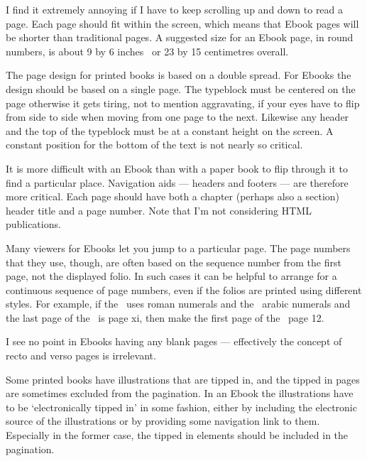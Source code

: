 \documentclass[10pt,letterpaper,extrafontsizes]{memoir}
\begin{document}
    I find it extremely annoying if I have to keep scrolling up and down
to read a page. Each page should fit within the screen, which means that
Ebook pages will be shorter than traditional pages. 
A suggested size for an Ebook page, in round numbers, is 
about 9 by 6 inches~\autocite{ADOBEBOOK} or 23 by 15 centimetres overall.

    The page design for printed books is based on a double spread. For
Ebooks the design should be based on a single page. The 
typeblock must be centered on the page otherwise it gets 
tiring, not to mention aggravating, if your eyes have to 
flip from side to side when moving from one page to the next. Likewise
any header and the top of the typeblock 
must be at a constant height on the screen. A constant position for the 
bottom of the text is not nearly so critical.

    It is more difficult with an Ebook than with a paper book 
to flip through it to find a particular place. 
Navigation aids --- headers and footers ---
are therefore more critical. Each page should have both a chapter 
(perhaps also a section) header title and a page number. 
Note that I'm not considering HTML publications.

    Many viewers for Ebooks let you jump to a particular page. The page
numbers that they use, though, are often based on the sequence number from
the first page, not the displayed folio. In such cases it 
can be helpful to arrange for a continuous sequence of page numbers, 
even if the folios are printed using different styles. 
For example, if the \pixfrontmatter\ uses roman numerals and the 
\pixmainmatter\ arabic numerals and the last page of the
\pixfrontmatter\ is page xi, then make the first page of the \pixmainmatter\ 
page 12.

    I see no point in Ebooks having any blank pages --- effectively the
concept of recto and verso pages is irrelevant.

    Some printed books have illustrations that are 
tipped in, and the tipped in pages are sometimes excluded from the 
pagination. In an Ebook the illustrations\index{illustration} have to 
be `electronically tipped in' in some fashion, either
by including the electronic source of the illustrations 
or by providing some navigation link to them. Especially in the former case, 
the tipped in elements should be included in the pagination.
\end{document}
